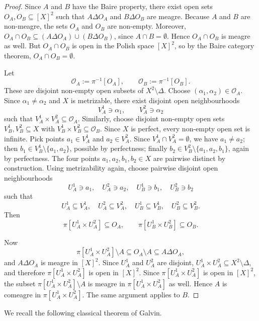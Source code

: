 \begin{proof}
    Since $A$ and $B$ have the Baire property, there exist open sets $O_A,O_B\subseteq [X]^2$ such that $A\Delta O_A$ and $B\Delta O_B$ are meagre.
    Because $A$ and $B$ are non-meagre, the sets $O_A$ and $O_B$ are non-empty.
    Moreover, $O_A\cap O_B\subseteq(A\Delta O_A)\cup(B\Delta O_B)$, since $A\cap B=\emptyset$.
    Hence $O_A\cap O_B$ is meagre as well.
    But $O_A\cap O_B$ is open in the Polish space $[X]^2$, so by the Baire category theorem, $O_A\cap O_B=\emptyset$.
 
    Let $$\mathcal O_A:=\pi^{-1}[O_A],\qquad\mathcal O_B:=\pi^{-1}[O_B].$$
    These are disjoint non-empty open subsets of $X^2\setminus\Delta$.
    Choose $(\alpha_1,\alpha_2)\in \mathcal O_A$.
    Since $\alpha_1\neq \alpha_2$ and $X$ is metrizable, there exist disjoint open neighbourhoods $$V_A^1\ni \alpha_1,\qquad V_A^2\ni \alpha_2$$ such that $V_A^1\times V_A^2\subseteq \mathcal O_A$.
    Similarly, choose disjoint non-empty open sets $V_B^1,V_B^2\subseteq X$ with $V_B^1\times V_B^2\subseteq \mathcal O_B$.
    Since $X$ is perfect, every non-empty open set is infinite.
    Pick points $a_1\in V_A^1$ and $a_2\in V_A^2$.
    Since $V_A^1\cap V_A^2=\emptyset$, we have $a_1\neq a_2$; then $b_1\in V_B^1\setminus\{a_1,a_2\}$, possible by perfectness; finally $b_2\in V_B^2\setminus\{a_1,a_2,b_1\}$, again by perfectness.
    The four points $a_1,a_2,b_1,b_2\in X$ are pairwise distinct by construction.
    Using metrizability again, choose pairwise disjoint open neighbourhoods $$U_A^1\ni a_1,\quad U_A^2\ni a_2,\quad U_B^1\ni b_1,\quad U_B^2\ni b_2$$ such that $$U_A^1\subseteq V_A^1,\quad U_A^2\subseteq V_A^2,\quad U_B^1\subseteq V_B^1,\quad U_B^2\subseteq V_B^2.$$
    Then $$\pi[U_A^1\times U_A^2]\subseteq O_A,\qquad\pi[U_B^1\times U_B^2]\subseteq O_B.$$
    
    Now $$\pi[U_A^1\times U_A^2]\setminus A\subseteq O_A\setminus A\subseteq A\Delta O_A,$$ and $A\Delta O_A$ is meagre in $[X]^2$.
    Since $U_A^1$ and $U_A^2$ are disjoint, $U_A^1\times U_A^2\subseteq X^2\setminus\Delta$, and therefore $\pi[U_A^1\times U_A^2]$ is open in $[X]^2$.
    Since $\pi[U_A^1\times U_A^2]$ is open in $[X]^2$, the subset $\pi[U_A^1\times U_A^2]\setminus A$ is meagre in $\pi[U_A^1\times U_A^2]$ as well.
    Hence $A$ is comeagre in $\pi[U_A^1\times U_A^2]$.
    The same argument applies to $B$.
\end{proof}
 
We recall the following classical theorem of Galvin.
 
